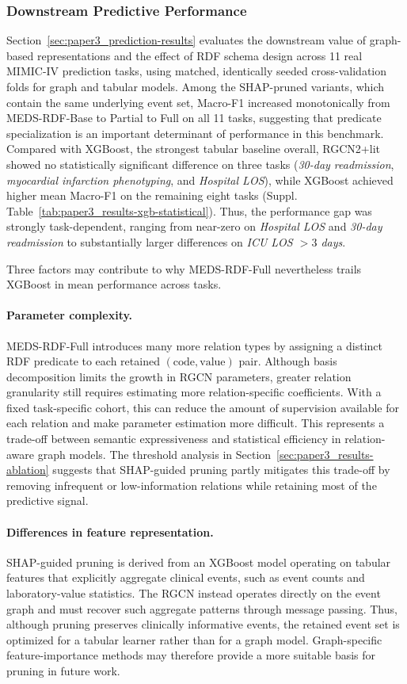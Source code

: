 \subsubsection{Downstream Predictive Performance}
Section~\ref{sec:paper3_prediction-results} evaluates the downstream value of graph-based representations and the effect of RDF schema design across 11 real MIMIC-IV prediction tasks, using matched, identically seeded cross-validation folds for graph and tabular models. Among the SHAP-pruned variants, which contain the same underlying event set, Macro-F1 increased monotonically from MEDS-RDF-Base to Partial to Full on all 11 tasks, suggesting that predicate specialization is an important determinant of performance in this benchmark. Compared with XGBoost, the strongest tabular baseline overall, RGCN2+lit showed no statistically significant difference on three tasks (\emph{30-day readmission}, \emph{myocardial infarction phenotyping}, and \emph{Hospital LOS}), while XGBoost achieved higher mean Macro-F1 on the remaining eight tasks (Suppl. Table~\ref{tab:paper3_results-xgb-statistical}). Thus, the performance gap was strongly task-dependent, ranging from near-zero on \emph{Hospital LOS} and \emph{30-day readmission} to substantially larger differences on \emph{ICU LOS $>3$ days}.

Three factors may contribute to why MEDS-RDF-Full nevertheless trails XGBoost in mean performance across tasks.

\paragraph{Parameter complexity.} MEDS-RDF-Full introduces many more relation types by assigning a distinct RDF predicate to each retained $(\text{code},\text{value})$ pair. Although basis decomposition limits the growth in RGCN parameters, greater relation granularity still requires estimating more relation-specific coefficients. With a fixed task-specific cohort, this can reduce the amount of supervision available for each relation and make parameter estimation more difficult. This represents a trade-off between semantic expressiveness and statistical efficiency in relation-aware graph models. The threshold analysis in Section~\ref{sec:paper3_results-ablation} suggests that SHAP-guided pruning partly mitigates this trade-off by removing infrequent or low-information relations while retaining most of the predictive signal.

\paragraph{Differences in feature representation.} SHAP-guided pruning is derived from an XGBoost model operating on tabular features that explicitly aggregate clinical events, such as event counts and laboratory-value statistics. The RGCN instead operates directly on the event graph and must recover such aggregate patterns through message passing. Thus, although pruning preserves clinically informative events, the retained event set is optimized for a tabular learner rather than for a graph model. Graph-specific feature-importance methods may therefore provide a more suitable basis for pruning in future work.

